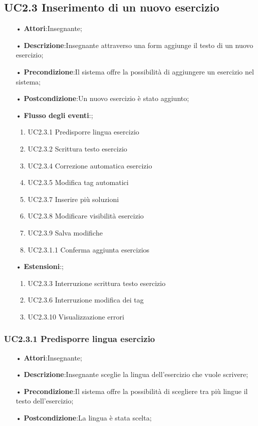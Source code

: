 


\subsection{UC2.3 Inserimento di un nuovo esercizio}
\begin{itemize}
	\item[•] \textbf{Attori}:Insegnante;
	\item[•] \textbf{Descrizione}:Insegnante attraverso una form aggiunge il testo di un nuovo esercizio;
	\item[•] \textbf{Precondizione}:Il sistema offre la possibilità di aggiungere un esercizio nel sistema;
	\item[•] \textbf{Postcondizione}:Un nuovo esercizio è stato aggiunto;
	\item[•] \textbf{Flusso degli eventi}:;
	\begin{enumerate}
		\item UC2.3.1 Predisporre lingua esercizio
		\item UC2.3.2 Scrittura testo esercizio
		\item UC2.3.4 Correzione automatica esercizio
		\item UC2.3.5 Modifica tag automatici
		\item UC2.3.7 Inserire più soluzioni
		\item UC2.3.8 Modificare visibilità esercizio
		\item UC2.3.9 Salva modifiche
		\item UC2.3.1.1	Conferma aggiunta esercizios
	\end{enumerate}
	\item[•] \textbf{Estensioni}:;	
	\begin{enumerate}
		\item UC2.3.3 Interruzione scrittura testo esercizio
		\item UC2.3.6 Interruzione modifica dei tag
		\item UC2.3.10 Visualizzazione errori
	\end{enumerate}
\end{itemize}

\subsubsection{UC2.3.1	Predisporre lingua esercizio}
\begin{itemize}
	\item[•] \textbf{Attori}:Insegnante;
	\item[•] \textbf{Descrizione}:Insegnante sceglie la lingua dell’esercizio che vuole scrivere;
	\item[•] \textbf{Precondizione}:Il sistema offre la possibilità di scegliere tra più lingue il testo 
			dell’esercizio;
	\item[•] \textbf{Postcondizione}:La lingua è stata scelta;
\end{itemize}

